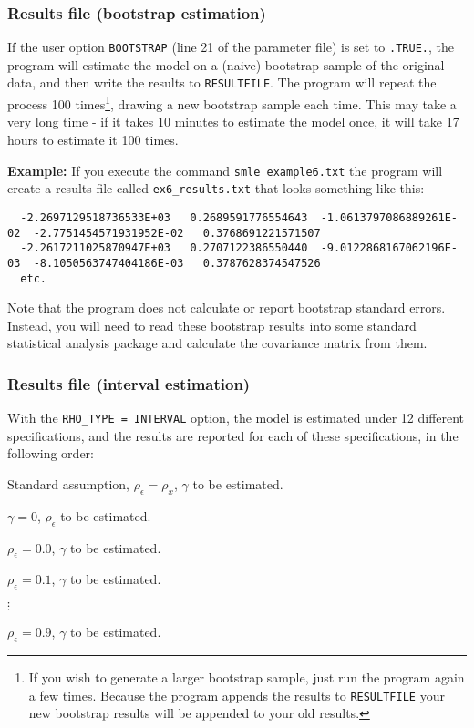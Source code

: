 \documentclass{article}
\begin{document}
\subsubsection{Results file (bootstrap estimation)}

If the user option {\tt BOOTSTRAP} (line 21 of the parameter file) is set 
to {\tt .TRUE.}, the program will estimate the model on a (naive) bootstrap
sample of the original data, and then write the results to {\tt RESULTFILE}.
The program will repeat the process 100 times\footnote{If you wish to generate 
a larger bootstrap sample, just run the program again a few times.  Because the program appends 
the results to {\tt RESULTFILE} your new bootstrap results
will be appended to your old results.}, drawing a new bootstrap sample
each time.  This may take a very long time - if it takes 10 minutes
to estimate the model once, it will take 17 hours to estimate it 100 times.

{\bf Example:} If you execute the command {\tt smle example6.txt} the 
program will create a results file called {\tt ex6\_results.txt} that
looks something like this:
{\scriptsize
\begin{verbatim}
  -2.2697129518736533E+03   0.2689591776554643  -1.0613797086889261E-02  -2.7751454571931952E-02   0.3768691221571507
  -2.2617211025870947E+03   0.2707122386550440  -9.0122868167062196E-03  -8.1050563747404186E-03   0.3787628374547526
  etc.
\end{verbatim}}
Note that the program does not calculate or report bootstrap standard errors.  
Instead, you will need to read these bootstrap results into some standard statistical 
analysis package and calculate the covariance matrix from them.


\subsubsection{Results file (interval estimation)}

With the {\tt RHO\_{}TYPE = INTERVAL} option, the model is estimated under 
12 different specifications, and the results are reported for each of these 
specifications, in the following order:
\begin{description}
	\item[Line 1] Standard assumption, $\rho_{\epsilon}=\rho_x$, $\gamma$ to be estimated.
	\item[Line 2] $\gamma=0$, $\rho_{\epsilon}$ to be estimated.
	\item[Line 3] $\rho_{\epsilon}= 0.0$, $\gamma$ to be estimated.
	\item[Line 4] $\rho_{\epsilon}= 0.1$, $\gamma$ to be estimated.
	\item $\vdots$
	\item[Line 12] $\rho_{\epsilon}= 0.9$, $\gamma$ to be estimated.
\end{description}
\end{document}
